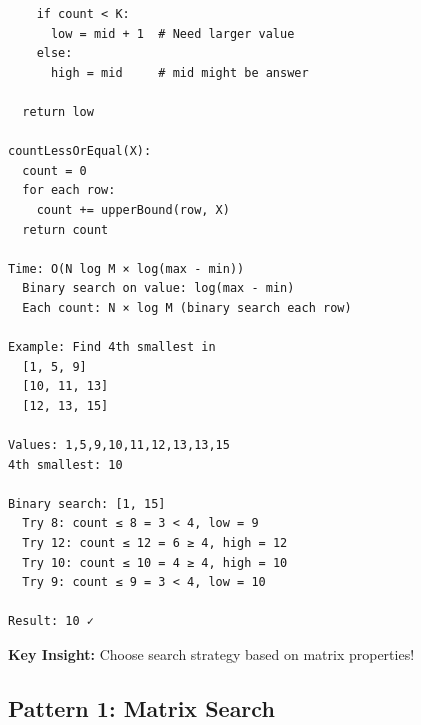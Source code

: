 \documentclass[11pt,a4paper,oneside]{book}
\begin{document}
\begin{tcolorbox}[
    enhanced,breakable,
    colback=white,
    colframe=deepblue,
    boxrule=1.5pt,
    arc=3mm,
    title=\textbf{The Matrix Search Paradigm}
]
\begin{verbatim}
    if count < K:
      low = mid + 1  # Need larger value
    else:
      high = mid     # mid might be answer

  return low

countLessOrEqual(X):
  count = 0
  for each row:
    count += upperBound(row, X)
  return count

Time: O(N log M × log(max - min))
  Binary search on value: log(max - min)
  Each count: N × log M (binary search each row)

Example: Find 4th smallest in
  [1, 5, 9]
  [10, 11, 13]
  [12, 13, 15]

Values: 1,5,9,10,11,12,13,13,15
4th smallest: 10

Binary search: [1, 15]
  Try 8: count ≤ 8 = 3 < 4, low = 9
  Try 12: count ≤ 12 = 6 ≥ 4, high = 12
  Try 10: count ≤ 10 = 4 ≥ 4, high = 10
  Try 9: count ≤ 9 = 3 < 4, low = 10

Result: 10 ✓
\end{verbatim}

\textbf{Key Insight:}
Choose search strategy based on matrix properties!
\end{tcolorbox}

\subsection{Pattern 1: Matrix Search}
\end{document}
